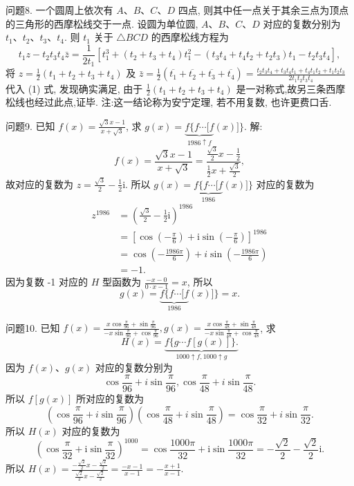 问题8. 一个圆周上依次有 $A 、 B 、 C 、 D$ 四点, 则其中任一点关于其余三点为顶点的三角形的西摩松线交于一点.
设圆为单位圆, $A 、 B 、 C 、 D$ 对应的复数分别为 $t_1 、 t_2 、 t_3 、 t_4$. 则 $t_1$ 关于 $\triangle B C D$ 的西摩松线方程为
$$
t_1 z-t_2 t_3 t_4 \bar{z}=\frac{1}{2 t_1}\left[t_1^3+\left(t_2+t_3+t_4\right) t_1^2-\left(t_3 t_4+t_4 t_2+t_2 t_3\right) t_1-t_2 t_3 t_4\right],
$$
将 $z=\frac{1}{2}\left(t_1+t_2+t_3+t_4\right)$ 及 $\bar{z}=\frac{1}{2}\left(\overline{t_1}+\overline{t_2}+\overline{t_3}+\overline{t_4}\right)= \frac{t_2 t_3 t_4+t_3 t_4 t_1+t_4 t_1 t_2+t_1 t_2 t_3}{2 t_1 t_2 t_3 t_4}$ 代入 (1) 式, 发现确实满足, 由于 $\frac{1}{2}\left(t_1+t_2+t_3+\right. \left.t_4\right)$ 是一对称式,故另三条西摩松线也经过此点,证毕.
注:这一结论称为安宁定理, 若不用复数, 也许更费口舌.



问题9. 已知 $f(x)=\frac{\sqrt{3} x-1}{x+\sqrt{3}}$, 求 $g(x)=\underbrace{f\{f \cdots[f}_{1986 \uparrow f}(x)]\}$.
解:$$
f(x)=\frac{\sqrt{3} x-1}{x+\sqrt{3}}=\frac{\frac{\sqrt{3}}{2} x-\frac{1}{2}}{\frac{1}{2} x+\frac{\sqrt{3}}{2}},
$$
故对应的复数为 $z=\frac{\sqrt{3}}{2}-\frac{1}{2} \mathrm{i}$.
所以 $g(x)=\underbrace{f\{f \cdots[f}_{1986}(x)]\}$ 对应的复数为
$$
\begin{aligned}
z^{1986} & =\left(\frac{\sqrt{3}}{2}-\frac{1}{2} \mathrm{i}\right)^{1986} \\
& =\left[\cos \left(-\frac{\pi}{6}\right)+\mathrm{i} \sin \left(-\frac{\pi}{6}\right)\right]^{1986} \\
& =\cos \left(-\frac{1986 \pi}{6}\right)+i \sin \left(-\frac{1986 \pi}{6}\right) \\
& =-1 .
\end{aligned}
$$
因为复数 -1 对应的 $H$ 型函数为 $\frac{-x-0}{0 \cdot x-1}=x$, 所以
$$
g(x)=\underbrace{f\{f \cdots[f}_{1986}(x)]\}=x .
$$



问题10. 已知 $f(x)=\frac{x \cos \frac{\pi}{96}+\sin \frac{\pi}{96}}{-x \sin \frac{\pi}{96}+\cos \frac{\pi}{96}}, g(x)=\frac{x \cos \frac{\pi}{48}+\sin \frac{\pi}{48}}{-x \sin \frac{\pi}{48}+\cos \frac{\pi}{48}}$, 求
$$
H(x)=\underbrace{f\{g \cdots f[g(x)]\} .}_{1000 \uparrow f, 1000 \uparrow g}
$$
因为 $f(x) 、 g(x)$ 对应的复数分别为
$$
\cos \frac{\pi}{96}+i \sin \frac{\pi}{96}, \cos \frac{\pi}{48}+i \sin \frac{\pi}{48} .
$$
所以 $f[g(x)]$ 所对应的复数为
$$
\left(\cos \frac{\pi}{96}+i \sin \frac{\pi}{96}\right)\left(\cos \frac{\pi}{48}+i \sin \frac{\pi}{48}\right)=\cos \frac{\pi}{32}+i \sin \frac{\pi}{32} .
$$
所以 $H(x)$ 对应的复数为
$$
\left(\cos \frac{\pi}{32}+\mathrm{i} \sin \frac{\pi}{32}\right)^{1000}=\cos \frac{1000 \pi}{32}+\mathrm{i} \sin \frac{1000 \pi}{32}=-\frac{\sqrt{2}}{2}-\frac{\sqrt{2}}{2} \mathrm{i} .
$$
所以 $H(x)=\frac{-\frac{\sqrt{2}}{2} x-\frac{\sqrt{2}}{2}}{\frac{\sqrt{2}}{2} x-\frac{\sqrt{2}}{2}}=\frac{-x-1}{x-1}=-\frac{x+1}{x-1}$.


